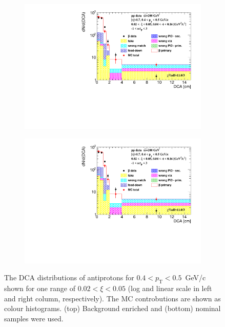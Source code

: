 \begin{figure}[htpb]
\begin{subfigure}{.47\textwidth}
		\includegraphics[width=\linewidth, page=4]{chapters/chrgSTAR/img/DCAproton/background_p_bar_0.pdf}
	\end{subfigure}
	\begin{subfigure}{.47\textwidth}
		\includegraphics[width=\linewidth, page=5]{chapters/chrgSTAR/img/DCAproton/background_p_bar_0.pdf}
	\end{subfigure}
	\caption{The $\textrm{DCA}$ distributions of antiprotons for $0.4<p_\textrm{T}<0.5$~GeV/c shown for one range of $0.02<\xi<0.05$ (log and linear scale in left and right column, respectively). The MC controbutions are shown as colour histograms. (top) Background enriched and (bottom) nominal samples were used.}
	\label{fig:bkg_proton_bar}
\end{figure}

